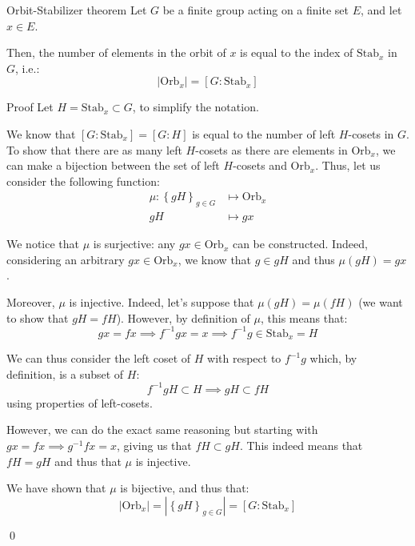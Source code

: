 \documentclass[a4paper]{article}
\begin{document}
\begin{parag}{Orbit-Stabilizer theorem}
    Let $G$ be a finite group acting on a finite set $E$, and let $x \in E$.

    Then, the number of elements in the orbit of $x$ is equal to the index of $\text{Stab}_x$ in $G$, i.e.: 
    \[\left|\text{Orb}_x\right| = \left[G : \text{Stab}_x\right]\]

    \begin{subparag}{Proof}
        Let $H = \text{Stab}_x \subset G$, to simplify the notation.

        We know that $\left[G : \text{Stab}_x\right] = \left[G : H\right]$ is equal to the number of left $H$-cosets in $G$. To show that there are as many left $H$-cosets as there are elements in $\text{Orb}_x$, we can make a bijection between the set of left $H$-cosets and $\text{Orb}_x$. Thus, let us consider the following function:
        \[\begin{split}
        \mu: \left\{gH\right\}_{g \in G} &\longmapsto \text{Orb}_x \\
        gH &\longmapsto g x
        \end{split}\]
        
        We notice that $\mu$ is surjective: any $gx \in \text{Orb}_x$ can be constructed. Indeed, considering an arbitrary $gx \in \text{Orb}_x$, we know that $g \in gH$ and thus $\mu\left(gH\right) = gx$.

        Moreover, $\mu$ is injective. Indeed, let's suppose that $\mu\left(g H\right) = \mu\left(f H\right)$ (we want to show that $gH = fH$). However, by definition of $\mu$, this means that: 
        \[gx = fx \implies f^{-1} g x = x \implies f^{-1} g \in \text{Stab}_x = H\]
        
        We can thus consider the left coset of $H$ with respect to $f^{-1} g$ which, by definition, is a subset of $H$: 
        \[f^{-1} g H \subset H \implies gH \subset fH\]
        using properties of left-cosets.

        However, we can do the exact same reasoning but starting with $gx = fx \implies g^{-1} f x = x$, giving us that $fH \subset gH$. This indeed means that $fH = gH$ and thus that $\mu$ is injective.

        We have shown that $\mu$ is bijective, and thus that: 
        \[\left|\text{Orb}_x\right| = \left|\left\{gH\right\}_{g \in G}\right| = \left[G : \text{Stab}_x\right]\]

        \qed
    \end{subparag}
\end{parag}
\end{document}

